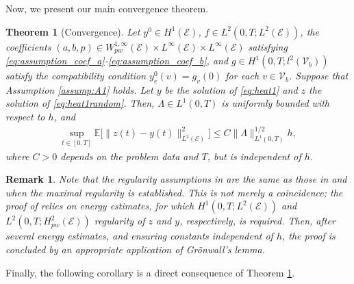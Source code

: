 \documentclass[10pt,a4paper]{amsart}
\newtheorem{theorem}{Theorem}[section]
\newtheorem{remark}{Remark}[section]
\begin{document}
Now, we present our main convergence theorem.


\begin{theorem}[Convergence]\label{th:convergence}
Let $y^0 \in H^1(\mathcal{E})$, $f \in L^2(0, T; L^2(\mathcal{E}))$, the coefficients $(a, b, p) \in W^{1,\infty}_{pw}(\mathcal{E}) \times L^\infty(\mathcal{E}) \times L^\infty(\mathcal{E})$ satisfying \eqref{eq:assumption_coef_a}-\eqref{eq:assumption_coef_b}, and $g \in H^1(0, T; l^2(\mathcal{V}_b))$ satisfy the compatibility condition $y^0_e(v) = g_v(0)$ for each $v \in \mathcal{V}_b$. Suppose that Assumption \ref{assump:A1} holds. Let $y$ be the solution of \eqref{eq:heat1} and $z$ the solution of \eqref{eq:heat1random}. Then, $\Lambda\in L^1(0,T)$ is uniformly bounded with respect to $h$, and
    \begin{align*}
        \sup_{t \in [0, T]} \mathbb{E}\big[\|z(t) - y(t)\|^2_{L^2(\mathcal{E})}\big] \leq C \|\Lambda\|_{L^1(0, T)}^{1/2} h,
    \end{align*}
    where $C > 0$ depends on the problem data and $T$, but is independent of $h$.
\end{theorem}



\begin{remark}
  Note that the regularity assumptions in  are the same as those in  and  when the maximal regularity is established. This is not merely a coincidence; the proof of  relies on energy estimates, for which $H^1(0,T;L^2(\mathcal{E}))$ and $L^2(0,T;H^2_{pw}(\mathcal{E}))$ regularity of $z$ and $y$, respectively, is required. Then, after several energy estimates, and ensuring constants independent of $h$, the proof is concluded by an appropriate application of Gr\"onwall's lemma.
\end{remark}
Finally, the following corollary is a direct consequence of Theorem \ref{th:convergence}.
\end{document}
